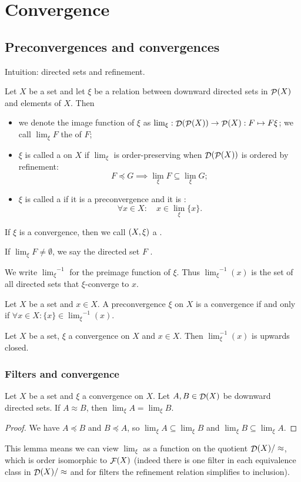 \chapter{Convergence}
\section{Preconvergences and convergences}
Intuition: directed sets and refinement.

\begin{definition}
Let $X$ be a set and let $\xi$ be a relation between downward directed sets in $\mathop{\mathcal{P}}(X)$ and elements of $X$. Then
\begin{itemize}
\item we denote the image function of $\xi$ as $\lim_\xi: \mathop{\mathcal{D}}(\mathop{\mathcal{P}}(X)) \to \mathop{\mathcal{P}}(X): F\mapsto F\xi$; we call $\lim_\xi F$ the  of $F$;
\item $\xi$ is called a  on $X$ if $\lim_\xi$ is order-preserving when $\mathop{\mathcal{D}}(\mathop{\mathcal{P}}(X))$ is ordered by refinement:
\[ F \preceq G \implies \lim_\xi F \subseteq \lim_\xi G; \]
\item $\xi$ is called a  if it is a preconvergence and it is :
\[ \forall x\in X: \quad x\in \lim_\xi \{x\}. \]
\end{itemize}
If $\xi$ is a convergence, then we call $\left( X, \xi \right)$ a .

If $\lim_\xi F \neq \emptyset$, we say the directed set $F$ .
\end{definition}
We write ${\lim_\xi}^{-1}$ for the preimage function of $\xi$. Thus ${\lim_\xi}^{-1}(x)$ is the set of all directed sets that $\xi$-converge to $x$.

\begin{lemma}
Let $X$ be a set and $x\in X$. A preconvergence $\xi$ on $X$ is a convergence \textup{if and only if} $\forall x\in X: \{x\} \in {\lim_\xi}^{-1}(x)$.
\end{lemma}

\begin{lemma}
Let $X$ be a set, $\xi$ a convergence on $X$ and $x\in X$. Then $\lim_\xi^{-1}(x)$ is upwards closed.
\end{lemma}

\subsection{Filters and convergence}
\begin{lemma}
Let $X$ be a set and $\xi$ a convergence on $X$. Let $A,B\in \mathop{\mathcal{D}}(X)$ be downward directed sets. If $A \approx B$, then $\lim_\xi A = \lim_\xi B$.
\end{lemma}
\begin{proof}
We have $A \preceq B$ and $B \preceq A$, so $\lim_\xi A \subseteq \lim_\xi B$ and $\lim_\xi B \subseteq \lim_\xi A$.
\end{proof}
This lemma means we can view $\lim_\xi$ as a function on the quotient $\mathop{\mathcal{D}}(X) /\approx$, which is order isomorphic to $\mathop{\mathcal{F}}(X)$ (indeed there is one filter in each equivalence class in $\mathop{\mathcal{D}}(X) /\approx$ and for filters the refinement relation simplifies to inclusion).

